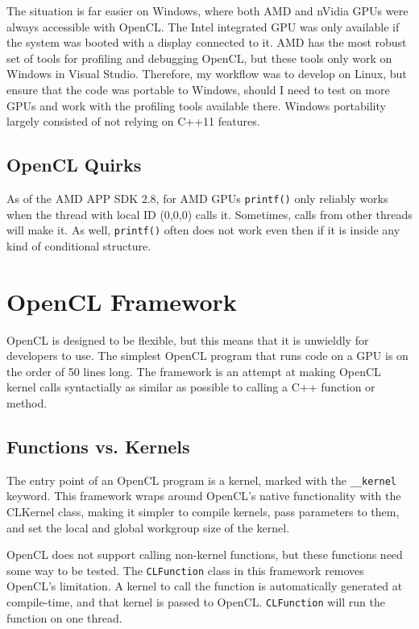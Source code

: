 \documentclass{article}
\begin{document}
The situation is far easier on Windows, where both AMD and nVidia GPUs were always accessible with OpenCL. The Intel integrated GPU was only available if the system was booted with a display connected to it. AMD has the most robust set of tools for profiling and debugging OpenCL, but these tools only work on Windows in Visual Studio. Therefore, my workflow was to develop on Linux, but ensure that the code was portable to Windows, should I need to test on more GPUs and work with the profiling tools available there. Windows portability largely consisted of not relying on C++11 features.

\subsection{OpenCL Quirks}
As of the AMD APP SDK 2.8, for AMD GPUs \texttt{printf()} only reliably works when the thread with local ID (0,0,0) calls it. Sometimes, calls from other threads will make it. As well, \texttt{printf()} often does not work even then if it is inside any kind of conditional structure.

\section{OpenCL Framework}
OpenCL is designed to be flexible, but this means that it is unwieldly for developers to use. The simplest OpenCL program that runs code on a GPU is on the order of 50 lines long. The framework is an attempt at making OpenCL kernel calls syntactially as similar as possible to calling a C++ function or method.

\subsection{Functions vs. Kernels}
The entry point of an OpenCL program is a kernel, marked with the \texttt{\_\_kernel} keyword. This framework wraps around OpenCL's native functionality with the CLKernel class, making it simpler to compile kernels, pass parameters to them, and set the local and global workgroup size of the kernel.

OpenCL does not support calling non-kernel functions, but these functions need some way to be tested. The \texttt{CLFunction} class in this framework removes OpenCL's limitation. A kernel to call the function is automatically generated at compile-time, and that kernel is passed to OpenCL. \texttt{CLFunction} will run the function on one thread.
\end{document}
